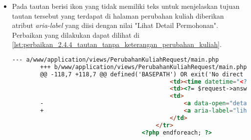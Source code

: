 \begin{itemize}
\begin{lstlisting}
                                                    <span aria-hidden="true">&times;</span>
                                                </button>
                                            </div>
        -                                    <a data-open="cetak<?= $request->id ?>"><i class="fi-print"></i></a>
        +                                    <a aria-label="cetak permohonan" data-open="cetak<?= $request->id ?>"><i class="fi-print"></i></a>
                                            <div class="reveal" id="hapus<?= $request->id ?>" data-reveal>
                                                <h5>Hapus Permohonan</h5>
                                                <form method="POST" action="/TranskripManage/remove">
        @@ -146,7 +146,7 @@ defined('BASEPATH') OR exit('No direct script access allowed');
                                                    <span aria-hidden="true">&times;</span>
                                                </button>
                                            </div>
        -                                    <a data-open="hapus<?= $request->id ?>"><i class="fi-trash"></i></a>
        +                                    <a aria-label="hapus permohonan" data-open="hapus<?= $request->id ?>"><i class="fi-trash"></i></a>
                                        </td>
                                    </tr>
                                <?php endforeach; ?>
    \end{lstlisting}

    \item Pada tautan berisi ikon yang tidak memiliki teks untuk menjelaskan tujuan tautan tersebut yang terdapat di halaman perubahan kuliah diberikan atribut \textit{aria-label} yang diisi dengan nilai "Lihat Detail Permohonan". Perbaikan yang dilakukan dapat dilihat di \ref{lst:perbaikan_2.4.4_tautan_tanpa_keterangan_perubahan_kuliah}.
    \begin{lstlisting}[frame=single, label={lst:perbaikan_2.4.4_tautan_tanpa_keterangan_perubahan_kuliah}, language=HTML, caption=Perbaikan Kriteria Sukses 2.4.4 - Tautan Tanpa Keterangan di Halaman Perubahan Kuliah]
        --- a/www/application/views/PerubahanKuliahRequest/main.php
        +++ b/www/application/views/PerubahanKuliahRequest/main.php
        @@ -118,7 +118,7 @@ defined('BASEPATH') OR exit('No direct script access allowed');
                                             <td><time datetime="<?= $request->answeredDateTime ?>"><?= $request->answeredDateString ?></time></td>
                                             <td><?= $request->answeredMessage ?></td>
                                             <td>
        -                                        <a data-open="detail<?= $request->id ?>"><i class="fi-eye"></i></a>
        +                                        <a aria-label="lihat detail permohonan" data-open="detail<?= $request->id ?>"><i class="fi-eye"></i></a>
                                             </td>
                                         </tr>
                                     <?php endforeach; ?>        
    \end{lstlisting}


\end{itemize}
